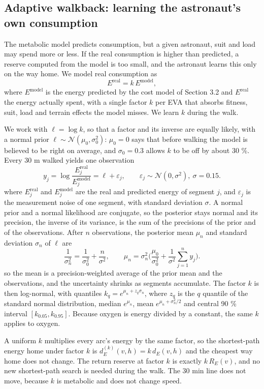 \documentclass[11pt,a4paper]{article}
\begin{document}
\subsection{Adaptive walkback: learning the astronaut's own consumption}

The metabolic model predicts consumption, but a given astronaut, suit and load may spend more or less. If the real consumption is higher than predicted, a reserve computed from the model is too small, and the astronaut learns this only on the way home. We model real consumption as \[E^\text{real} = k\,E^\text{model},\] where $E^\text{model}$ is the energy predicted by the cost model of Section 3.2 and $E^\text{real}$ the energy actually spent, with a single factor $k$ per EVA that absorbs fitness, suit, load and terrain effects the model misses. We learn $k$ during the walk.

We work with $\ell = \log k$, so that a factor and its inverse are equally likely, with a normal prior $\ell \sim \mathcal N(\mu_0, \sigma_0^2)$: $\mu_0 = 0$ says that before walking the model is believed to be right on average, and $\sigma_0 = 0.3$ allows $k$ to be off by about 30 \%. Every 30 m walked yields one observation \[y_j = \log\frac{E^\text{real}_j}{E^\text{model}_j} = \ell + \varepsilon_j,\qquad \varepsilon_j \sim \mathcal N(0, \sigma^2),\ \sigma = 0.15.\] where $E^\text{real}_j$ and $E^\text{model}_j$ are the real and predicted energy of segment $j$, and $\varepsilon_j$ is the measurement noise of one segment, with standard deviation $\sigma$. A normal prior and a normal likelihood are conjugate, so the posterior stays normal and its precision, the inverse of its variance, is the sum of the precisions of the prior and of the observations. After $n$ observations, the posterior mean $\mu_n$ and standard deviation $\sigma_n$ of $\ell$ are \[\frac{1}{\sigma_n^2} = \frac{1}{\sigma_0^2} + \frac{n}{\sigma^2},\qquad \mu_n = \sigma_n^2\Big(\frac{\mu_0}{\sigma_0^2} + \frac{1}{\sigma^2}\sum_{j=1}^n y_j\Big).\] so the mean is a precision-weighted average of the prior mean and the observations, and the uncertainty shrinks as segments accumulate. The factor $k$ is then log-normal, with quantiles $k_q = e^{\mu_n + z_q \sigma_n}$, where $z_q$ is the $q$ quantile of the standard normal distribution, median $e^{\mu_n}$, mean $e^{\mu_n + \sigma_n^2/2}$ and central 90 \% interval $[k_{0.05}, k_{0.95}]$. Because oxygen is energy divided by a constant, the same $k$ applies to oxygen.

A uniform $k$ multiplies every arc's energy by the same factor, so the shortest-path energy home under factor $k$ is $d^{(k)}_E(v, h) = k\,d_E(v, h)$ and the cheapest way home does not change. The return reserve at factor $k$ is exactly $k\,R_E(v)$, and no new shortest-path search is needed during the walk. The 30 min line does not move, because $k$ is metabolic and does not change speed.
\end{document}
